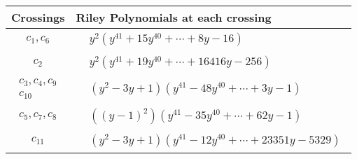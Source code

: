 \documentclass[1p]{elsarticle_modified}
\theoremstyle{definition}
\begin{document}
\begin{tabular}{m{50pt}|m{274pt}}
Crossings & \hspace{64pt}Riley Polynomials at each crossing \\
\hline $$\begin{aligned}c_{1},c_{6}\end{aligned}$$&$\begin{aligned}
&y^2(y^{41}+15 y^{40}+\cdots+8 y-16)
\end{aligned}$\\
\hline $$\begin{aligned}c_{2}\end{aligned}$$&$\begin{aligned}
&y^2(y^{41}+19 y^{40}+\cdots+16416 y-256)
\end{aligned}$\\
\hline $$\begin{aligned}c_{3},c_{4},c_{9}\\c_{10}\end{aligned}$$&$\begin{aligned}
&(y^2-3 y+1)(y^{41}-48 y^{40}+\cdots+3 y-1)
\end{aligned}$\\
\hline $$\begin{aligned}c_{5},c_{7},c_{8}\end{aligned}$$&$\begin{aligned}
&((y-1)^2)(y^{41}-35 y^{40}+\cdots+62 y-1)
\end{aligned}$\\
\hline $$\begin{aligned}c_{11}\end{aligned}$$&$\begin{aligned}
&(y^2-3 y+1)(y^{41}-12 y^{40}+\cdots+23351 y-5329)
\end{aligned}$\\
\hline
\end{tabular}
\vskip 2pc
\end{document}
